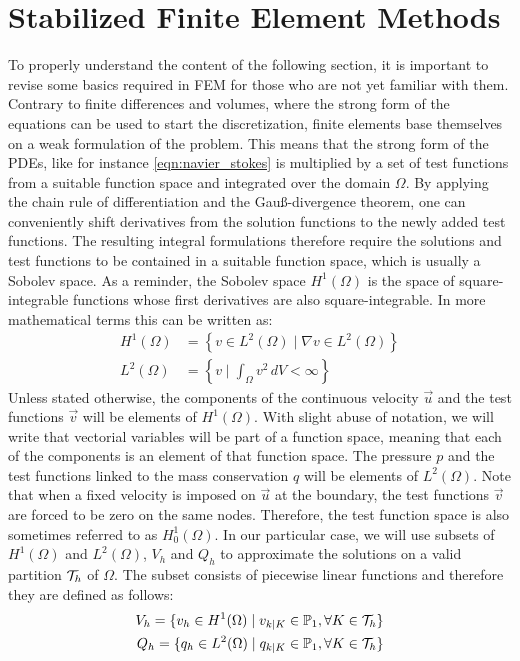 \section{Stabilized Finite Element Methods}\label{chap2:sec2}
To properly understand the content of the following section, it is important to revise some basics required in FEM for those who are not yet familiar with them. Contrary to finite differences and volumes, where the strong form of the equations can be used to start the discretization, finite elements base themselves on a weak formulation of the problem. This means that the strong form of the PDEs, like for instance \autoref{eqn:navier_stokes} is multiplied by a set of test functions from a suitable function space and integrated over the domain $\Omega$. By applying the chain rule of differentiation and the Gau\ss-divergence theorem, one can conveniently shift derivatives from the solution functions to the newly added test functions. The resulting integral formulations therefore require the solutions and test functions to be contained in a suitable function space, which is usually a Sobolev space. As a reminder, the Sobolev space $H^1(\Omega)$ is the space of square-integrable functions whose first derivatives are also square-integrable. In more mathematical terms this can be written as:
\begin{equation*}
	\begin{split}
		H^1(\Omega) &= \left\{ v \in L^2(\Omega) \mid \nabla v \in L^2(\Omega) \right\}\\
		L^2(\Omega) &= \left\{ v \mid \int_{\Omega} v^2 \,dV < \infty \right\}
	\end{split}
\end{equation*}
Unless stated otherwise, the components of the continuous velocity $\vec{u}$ and the test functions $\vec{v}$ will be elements of $H^1(\Omega)$. With slight abuse of notation, we will write that vectorial variables will be part of a function space, meaning that each of the components is an element of that function space. The pressure $p$ and the test functions linked to the mass conservation $q$ will be elements of $L^2(\Omega)$. Note that when a fixed velocity is imposed on $\vec{u}$ at the boundary, the test functions $\vec{v}$ are forced to be zero on the same nodes. Therefore, the test function space is also sometimes referred to as $H^1_0(\Omega)$. In our particular case, we will use subsets of $H^1(\Omega)$ and $L^2(\Omega)$, $V_h$ and $Q_h$ to approximate the solutions on a valid partition $\mathcal{T}_h$ of $\Omega$. The subset consists of piecewise linear functions and therefore they are defined as follows:
\begin{equation}
	\begin{split}
		V_h = {\{v_h \in H^1(\Omega) \mid v_{k|K} \in \mathbb{P}_1, \forall K\in \mathcal{T}_h\}}&\\
		Q_h = {\{q_h \in L^2(\Omega) \mid q_{k|K} \in \mathbb{P}_1, \forall K\in \mathcal{T}_h\}}&\\
	\end{split}
	\label{eqn:lin_spaces}
\end{equation}


